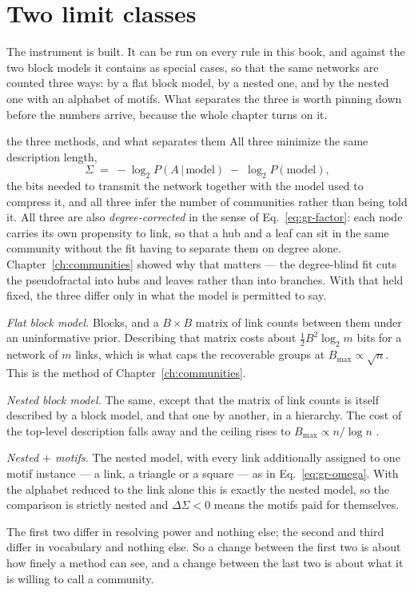 \section{Two limit classes}
\label{sec:gr-classes}

The instrument is built. It can be run on every rule in this book, and against
the two block models it contains as special cases, so that the same networks are
counted three ways: by a flat block model, by a nested one, and by the nested one
with an alphabet of motifs. What separates the three is worth pinning down before
the numbers arrive, because the whole chapter turns on it.

\begin{calculation}{the three methods, and what separates them}
All three minimize the same description length,
\begin{equation}
  \Sigma \;=\; -\log_2 P(A\,|\,\text{model}) \;-\; \log_2 P(\text{model}),
  \label{eq:gr-sigma}
\end{equation}
the bits needed to transmit the network together with the model used to compress
it, and all three infer the number of communities rather than being told it. All
three are also \emph{degree-corrected} in the sense of
Eq.~\eqref{eq:gr-factor}: each node carries its own propensity to link, so that a
hub and a leaf can sit in the same community without the fit having to separate
them on degree alone. Chapter~\ref{ch:communities} showed why that matters --- the
degree-blind fit cuts the pseudofractal into hubs and leaves rather than into
branches. With that held fixed, the three differ only in what the model is
permitted to say.

\emph{Flat block model.} Blocks, and a $B\times B$ matrix of link counts between
them under an uninformative prior. Describing that matrix costs about
$\tfrac12B^2\log_2 m$ bits for a network of $m$ links, which is what caps the
recoverable groups at $B_{\max}\propto\sqrt n$. This is the method of
Chapter~\ref{ch:communities}.

\emph{Nested block model.} The same, except that the matrix of link counts is
itself described by a block model, and that one by another, in a hierarchy. The
cost of the top-level description falls away and the ceiling rises to
$B_{\max}\propto n/\log n$ \citep{peixoto2014hier}.

\emph{Nested $+$ motifs.} The nested model, with every link additionally assigned
to one motif instance --- a link, a triangle or a square --- as in
Eq.~\eqref{eq:gr-omega}. With the alphabet reduced to the link alone this is
exactly the nested model, so the comparison is strictly nested and
$\Delta\Sigma<0$ means the motifs paid for themselves.

The first two differ in resolving power and nothing else; the second and third
differ in vocabulary and nothing else. So a change between the first two is about
how finely a method can see, and a change between the last two is about what it
is willing to call a community.
\end{calculation}


